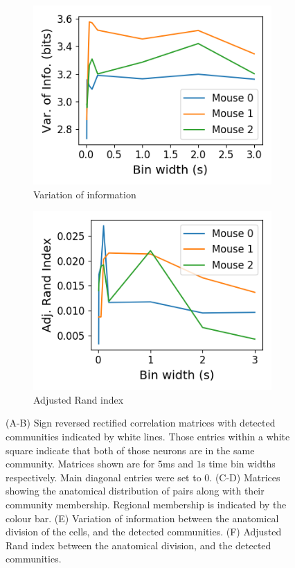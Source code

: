 \begin{figure}[p]
\begin{subfigure}[h]{0.5\linewidth}
      \includegraphics[width=\linewidth]{figures/eight_probe/variation_of_information_negative_total.png}
      \caption{Variation of information}
      \label{fig:variation_of_information_negative_total}
    \end{subfigure}
    \begin{subfigure}[h]{0.5\linewidth}
      \includegraphics[width=\linewidth]{figures/eight_probe/adjusted_rand_index_negative_total.png}
      \caption{Adjusted Rand index}
      \label{fig:adjusted_rand_index_negative_total}
    \end{subfigure}
    \caption{(A-B) Sign reversed rectified correlation matrices with detected communities indicated by white lines. Those entries within a white square indicate that both of those neurons are in the same community. Matrices shown are for $5$ms and $1$s time bin widths respectively. Main diagonal entries were set to $0$. (C-D) Matrices showing the anatomical distribution of pairs along with their community membership. Regional membership is indicated by the colour bar. (E) Variation of information between the anatomical division of the cells, and the detected communities. (F) Adjusted Rand index between the anatomical division, and the detected communities.}
    \label{fig:negative_consensus_clusterings_with_regions}
  \end{figure}

